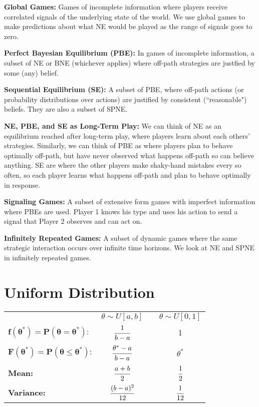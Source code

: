\documentclass{report}
\begin{document}
\textbf{Global Games:} Games of incomplete information where players receive correlated signals of the underlying state of the world. We use global games to make predictions about what NE would be played as the range of signals goes to zero. \bigskip \bigskip

\textbf{Perfect Bayesian Equilibrium (PBE):} In games of incomplete information, a subset of NE or BNE (whichever applies) where off-path strategies are justfied by some (any) belief. \bigskip \bigskip

\textbf{Sequential Equilibrium (SE):} A subset of PBE, where off-path actions (or probability distributions over actions) are justified by consistent (``reasonable") beliefs. They are also a subset of SPNE. \bigskip \bigskip

\textbf{NE, PBE, and SE as Long-Term Play:} We can think of NE as an equilibrium reached after long-term play, where players learn about each others' strategies. Similarly, we can think of PBE as where players plan to behave optimally off-path, but have never observed what happens off-path so can believe anything. SE are where the other players make shaky-hand mistakes every so often, so each player learns what happens off-path and plan to behave optimally in response. \bigskip \bigskip

\textbf{Signaling Games:} A subset of extensive form games with imperfect information where PBEs are used. Player 1 knows his type and uses his action to send a signal that Player 2 observes and can act on. \bigskip \bigskip

\textbf{Infinitely Repeated Games:} A subset of dynamic games where the same strategic interaction occurs over infinite time horizons. We look at NE and SPNE in infinitely repeated games. \bigskip \bigskip

\newpage

\section*{Uniform Distribution}\medskip

\begin{center}
	\begin{tabular}{l c c c}
		& $\theta \sim U[a,b]$ & \hspace{30pt} & $\theta \sim U[0,1]$\\[15pt]
		$\boldsymbol{f(\theta^*) = P(\theta = \theta^*):}$ \hspace{30pt} & $\cfrac{1}{b - a}$ & & 1 \\[15pt]
		$\boldsymbol{F(\theta^*) = P(\theta \leq \theta^*):}$ & $\cfrac{\theta^* - a}{b - a}$ & & $\theta^*$\\[15pt]
		\textbf{Mean:} & $\cfrac{a+b}{2}$ & & $\cfrac{1}{2}$\\[15pt]
		\textbf{Variance:} & $\cfrac{(b-a)^2}{12}$ & & $\cfrac{1}{12}$\\[15pt]
	\end{tabular}
\end{center}
\end{document}
